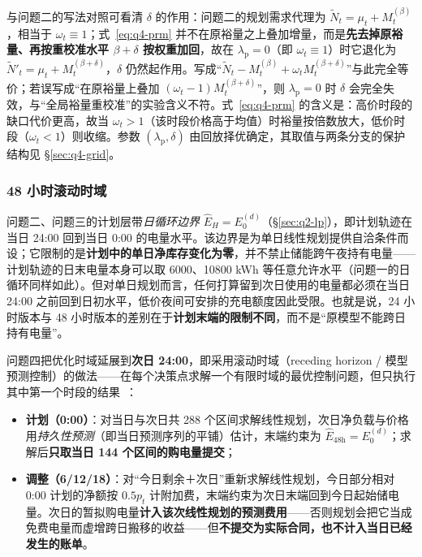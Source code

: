 与问题二的写法对照可看清 $\delta$ 的作用：问题二的规划需求代理为 $\widetilde N_t=\mu_t+M^{(\beta)}_t$，相当于 $\omega_t\equiv1$；式~\eqref{eq:q4-prm} 并不在原裕量之上叠加增量，而是\textbf{先去掉原裕量、再按重校准水平 $\beta+\delta$ 按权重加回}，故在 $\lambda_{\mathrm{p}}=0$（即 $\omega_t\equiv1$）时它退化为 $\widetilde N'_t=\mu_t+M^{(\beta+\delta)}_t$，$\delta$ 仍然起作用。写成``$\widetilde N_t-M^{(\beta)}_t+\omega_tM^{(\beta+\delta)}_t$''与此完全等价；若误写成``在原裕量上叠加 $(\omega_t-1)M^{(\beta+\delta)}_t$''，则 $\lambda_{\mathrm{p}}=0$ 时 $\delta$ 会完全失效，与``全局裕量重校准''的实验含义不符。式~\eqref{eq:q4-prm} 的含义是：高价时段的缺口代价更高，故当 $\omega_t>1$（该时段价格高于均值）时裕量按倍数放大，低价时段（$\omega_t<1$）则收缩。参数 $(\lambda_{\mathrm{p}},\delta)$ 由回放择优确定，其取值与两条分支的保护结构见 \S\ref{sec:q4-grid}。

\subsubsection{48 小时滚动时域}
\label{sec:q4-horizon}

问题二、问题三的计划层带\emph{日循环边界} $\widehat E_H=E_0^{(d)}$（\S\ref{sec:q2-lp}），即计划轨迹在当日 24:00 回到当日 0:00 的电量水平。该边界是为单日线性规划提供自洽条件而设；它限制的是\textbf{计划中的单日净库存变化为零}，并不禁止储能跨午夜持有电量——计划轨迹的日末电量本身可以取 6000、10800 kWh 等任意允许水平（问题一的日循环同样如此）。但对单日规划而言，任何打算留到次日使用的电量都必须在当日 24:00 之前回到日初水平，低价夜间可安排的充电额度因此受限。也就是说，24 小时版本与 48 小时版本的差别在于\textbf{计划末端的限制不同}，而不是``原模型不能跨日持有电量''。

问题四把优化时域延展到\textbf{次日 24:00}，即采用滚动时域（receding horizon / 模型预测控制）的做法——在每个决策点求解一个有限时域的最优控制问题，但只执行其中第一个时段的结果~\cite{mpc}：

\begin{itemize}
  \item \textbf{计划（0:00）}：对当日与次日共 288 个区间求解线性规划，次日净负载与价格用\emph{持久性预测}（即当日预测序列的平铺）估计，末端约束为 $\widehat E_{48\text{h}}=E_0^{(d)}$；求解后\textbf{只取当日 144 个区间的购电量提交}；
  \item \textbf{调整（6/12/18）}：对``今日剩余＋次日''重新求解线性规划，今日部分相对 0:00 计划的净额按 $0.5p_t$ 计附加费，末端约束为次日末端回到今日起始储电量。次日的暂拟购电量\textbf{计入该次线性规划的预测费用}——否则规划会把它当成免费电量而虚增跨日搬移的收益——但\textbf{不提交为实际合同，也不计入当日已经发生的账单}。
\end{itemize}

